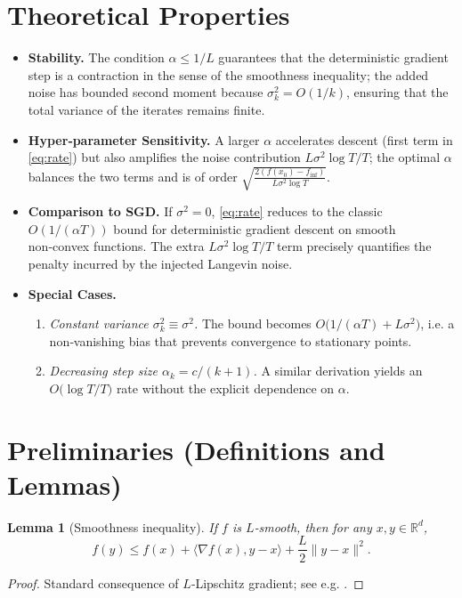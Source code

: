 \documentclass{article}
\newtheorem{lemma}{Lemma}
\newcommand{\R}{\mathbb{R}}
\begin{document}
\section*{Theoretical Properties}
\begin{itemize}[leftmargin=*]
\item \textbf{Stability.} The condition $\alpha\le 1/L$ guarantees that the deterministic gradient step is a contraction in the sense of the smoothness inequality; the added noise has bounded second moment because $\sigma_{k}^{2}=O(1/k)$, ensuring that the total variance of the iterates remains finite.
\item \textbf{Hyper‑parameter Sensitivity.} A larger $\alpha$ accelerates descent (first term in \eqref{eq:rate}) but also amplifies the noise contribution $L\sigma^{2}\log T/T$; the optimal $\alpha$ balances the two terms and is of order $\sqrt{\frac{2(f(x_{0})-f_{\inf})}{L\sigma^{2}\log T}}$.
\item \textbf{Comparison to SGD.} If $\sigma^{2}=0$, \eqref{eq:rate} reduces to the classic $O(1/(\alpha T))$ bound for deterministic gradient descent on smooth non‑convex functions. The extra $L\sigma^{2}\log T/T$ term precisely quantifies the penalty incurred by the injected Langevin noise.
\item \textbf{Special Cases.}
\begin{enumerate}
\item \emph{Constant variance $\sigma_{k}^{2}\equiv\sigma^{2}$.} The bound becomes $O\!\bigl(1/(\alpha T)+L\sigma^{2}\bigr)$, i.e. a non‑vanishing bias that prevents convergence to stationary points.
\item \emph{Decreasing step size $\alpha_{k}=c/(k+1)$.} A similar derivation yields an $O\!\bigl(\log T/T\bigr)$ rate without the explicit dependence on $\alpha$.
\end{enumerate}
\end{itemize}

\section*{Preliminaries (Definitions and Lemmas)}
\begin{lemma}[Smoothness inequality]\label{lem:smooth}
If $f$ is $L$‑smooth, then for any $x,y\in\R^{d}$,
\[
f(y)\le f(x)+\langle\nabla f(x),y-x\rangle+\frac{L}{2}\|y-x\|^{2}.
\]
\end{lemma}
\begin{proof}
Standard consequence of $L$‑Lipschitz gradient; see e.g. \cite{Nesterov2004}.
\end{proof}
\end{document}
